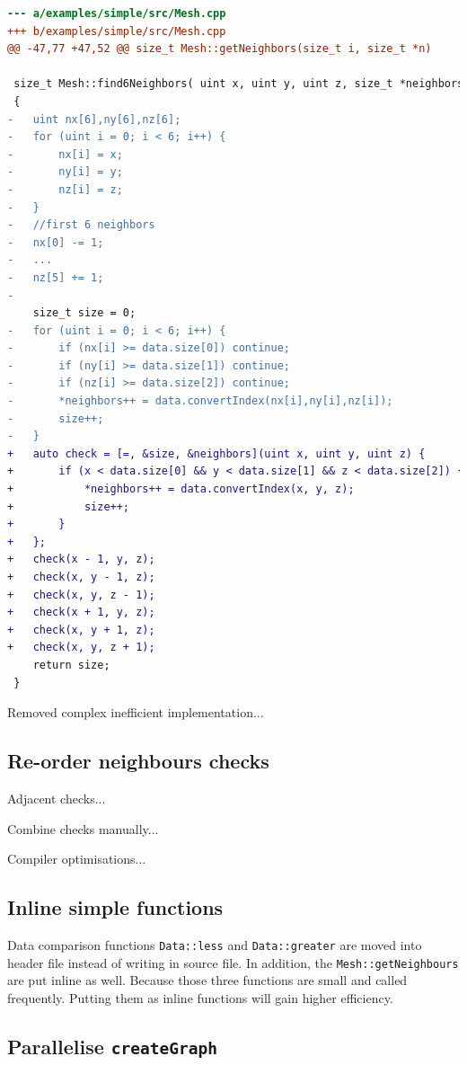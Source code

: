 \documentclass[conference]{IEEEtran}
\begin{document}
\begin{lstlisting}[language=diff,label=lst:find, float, floatplacement=t]
--- a/examples/simple/src/Mesh.cpp
+++ b/examples/simple/src/Mesh.cpp
@@ -47,77 +47,52 @@ size_t Mesh::getNeighbors(size_t i, size_t *n)

 size_t Mesh::find6Neighbors( uint x, uint y, uint z, size_t *neighbors)
 {
-   uint nx[6],ny[6],nz[6];
-   for (uint i = 0; i < 6; i++) {
-       nx[i] = x;
-       ny[i] = y;
-       nz[i] = z;
-   }
-   //first 6 neighbors
-   nx[0] -= 1;
-   ...
-   nz[5] += 1;
-
    size_t size = 0;
-   for (uint i = 0; i < 6; i++) {
-       if (nx[i] >= data.size[0]) continue;
-       if (ny[i] >= data.size[1]) continue;
-       if (nz[i] >= data.size[2]) continue;
-       *neighbors++ = data.convertIndex(nx[i],ny[i],nz[i]);
-       size++;
-   }
+   auto check = [=, &size, &neighbors](uint x, uint y, uint z) {
+       if (x < data.size[0] && y < data.size[1] && z < data.size[2]) {
+           *neighbors++ = data.convertIndex(x, y, z);
+           size++;
+       }
+   };
+   check(x - 1, y, z);
+   check(x, y - 1, z);
+   check(x, y, z - 1);
+   check(x + 1, y, z);
+   check(x, y + 1, z);
+   check(x, y, z + 1);
    return size;
 }
\end{lstlisting}

Removed complex inefficient implementation...

\subsection{Re-order neighbours checks}

Adjacent checks...

Combine checks manually...

Compiler optimisations...

\subsection{Inline simple functions}

Data comparison functions \texttt{Data::less} and \texttt{Data::greater} are moved into header file instead of writing in source file. In addition, the \texttt{Mesh::getNeighbours} are put inline as well. Because those three functions are small and called frequently. Putting them as inline functions will gain higher efficiency. 

\subsection{Parallelise \texttt{createGraph}}
\end{document}
